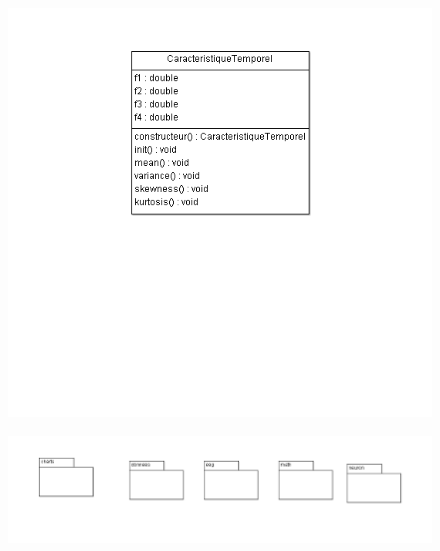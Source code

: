 			\begin{figure}
			\centering
		    \includegraphics []{../diagramme_classes/neuron.png} \\
			\label{fig_neuron}
    		\end{figure}
			\begin{figure}
			\centering
		    \includegraphics []{../diagramme_classes/packages.png} \\
			\label{fig_pack}
    		\end{figure}
		

